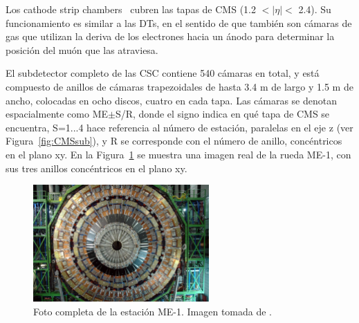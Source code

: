 Los cathode strip chambers~\cite{CSCperformance} cubren las tapas de CMS (1.2 $< \lvert \eta \rvert <$ 2.4). Su funcionamiento es similar a las DTs, en el sentido de que tambi\'en son c\'amaras de gas que utilizan la deriva de los electrones hacia un \'anodo para determinar la posici\'on del mu\'on que las atraviesa.

El subdetector completo de las CSC contiene 540 c\'amaras en total, y est\'a compuesto de anillos de c\'amaras trapezoidales de hasta 3.4 m de largo y 1.5 m de ancho, colocadas en ocho discos, cuatro en cada tapa. Las c\'amaras se denotan espacialmente como ME$\pm$S/R, donde el signo indica en qu\'e tapa de CMS se encuentra, S=1...4 hace referencia al n\'umero de estaci\'on, paralelas en el eje z (ver Figura~\ref{fig:CMSsub}), y R se corresponde con el n\'umero de anillo, conc\'entricos en el plano xy. En la Figura~\ref{fig:CSC_MEm1} se muestra una imagen real de la rueda ME-1, con sus tres anillos conc\'entricos en el plano xy.

\begin{figure}[h]
\centering
\includegraphics[width=0.60\textwidth]{figures/CSC_MEm1.jpg}
\caption{Foto completa de la estaci\'on ME-1. Imagen tomada de \cite{Breedon:1431505}.}
\label{fig:CSC_MEm1}        
\end{figure}


